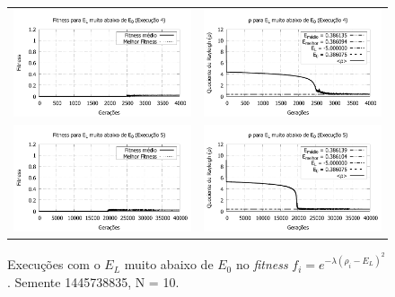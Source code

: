 \begin{figure}[p]
\begin{tabular}{@{}cc@{}}
		\includegraphics[width=.40\textwidth]{figs/resultados/variandoEL/T4E4_fitness-extendido.pdf} &
    \includegraphics[width=.40\textwidth]{figs/resultados/variandoEL/T4E4_rho_extendido.pdf}   \\
		
		\includegraphics[width=.40\textwidth]{figs/resultados/variandoEL/T4E5_fitness-extendido.pdf} &
    \includegraphics[width=.40\textwidth]{figs/resultados/variandoEL/T4E5_rho_extendido.pdf}
		
  \end{tabular}
  \caption{Execuções com o $E_L$ muito abaixo de $E_0$ no \textit{fitness} $f_i = e^{-\lambda(\rho_i - E_L)^2}$. Semente 1445738835, N = 10.}
	\label{fig:variando_EL_muito_abaixo}
	\end{figure}
	
